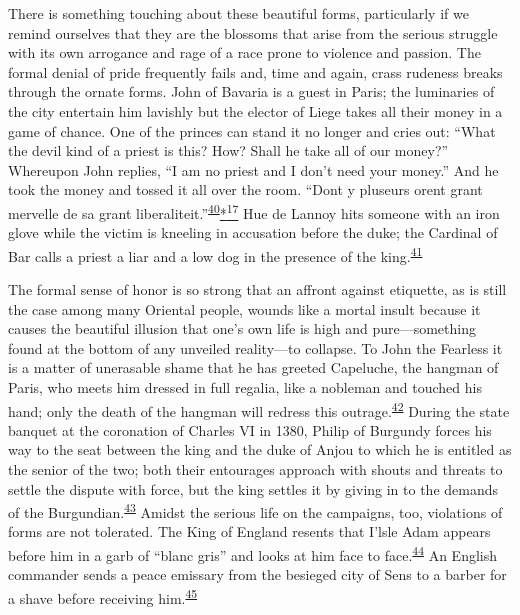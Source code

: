 There is something touching about these beautiful forms, particularly if
we remind ourselves that they are the blossoms that arise from the
serious struggle with its own arrogance and rage of a race prone to
violence and passion. The formal denial of pride frequently fails and,
time and again, crass rudeness breaks through the ornate forms. John of
Bavaria is a guest in Paris; the luminaries of the city entertain him
lavishly but the elector of Liege takes all their money in a game of
chance. One of the princes can stand it no longer and cries out: ``What
the devil kind of a priest is this? How? Shall he take all of our
money?'' Whereupon John replies, ``I am no priest and I don't need your
money.'' And he took the money and tossed it all over the room. ``Dont y
pluseurs orent grant mervelle de sa grant
liberaliteit.''\textsuperscript{\protect\hypertarget{09_Chapter_Two__THE_CRAVING_FOR_A_M.xhtmlux5cux23id_2008}{\protect\hyperlink{23_NOTES.xhtmlux5cux23page_403}{40}}}\protect\hypertarget{09_Chapter_Two__THE_CRAVING_FOR_A_M.xhtmlux5cux23id_2441}{\protect\hyperlink{23_NOTES.xhtmlux5cux23id_2442}{*\textsuperscript{17}}}
Hue de Lannoy hits someone with an iron glove while the victim is
kneeling in accusation before the duke; the Cardinal of Bar calls a
priest a liar and a low dog in the presence of the
king.\textsuperscript{\protect\hypertarget{09_Chapter_Two__THE_CRAVING_FOR_A_M.xhtmlux5cux23id_2006}{\protect\hyperlink{23_NOTES.xhtmlux5cux23id_2007}{41}}}

The formal sense of honor is so strong that an affront against
etiquette, as is still the case among many Oriental people, wounds like
a mortal insult because it causes the beautiful illusion that one's own
life is high and pure---something found at the bottom of any unveiled
reality---to collapse. To John the Fearless it is a matter of unerasable
shame that he has greeted Capeluche, the hangman of Paris, who meets him
dressed in full regalia, like a nobleman and touched his hand; only the
death of the hangman will redress this
outrage.\textsuperscript{\protect\hypertarget{09_Chapter_Two__THE_CRAVING_FOR_A_M.xhtmlux5cux23id_2004}{\protect\hyperlink{23_NOTES.xhtmlux5cux23id_2005}{42}}}
During the state banquet at the coronation of Charles VI in 1380, Philip
of Burgundy forces his way to the seat between the king and the duke of
Anjou to which he is entitled as the senior of the two; both their
entourages approach with shouts and threats to settle the dispute with
force, but the king settles it by giving in to the demands of the
Burgundian.\textsuperscript{\protect\hypertarget{09_Chapter_Two__THE_CRAVING_FOR_A_M.xhtmlux5cux23id_2002}{\protect\hyperlink{23_NOTES.xhtmlux5cux23id_2003}{43}}}
Amidst the serious life on the campaigns, too, violations of forms are
not tolerated. The King of England resents that I'lsle Adam appears
before him in a garb of ``blanc gris'' and looks at him face to
face.\textsuperscript{\protect\hypertarget{09_Chapter_Two__THE_CRAVING_FOR_A_M.xhtmlux5cux23id_2000}{\protect\hyperlink{23_NOTES.xhtmlux5cux23id_2001}{44}}}
An English commander sends a peace emissary from the besieged city of
Sens to a barber for a shave before receiving
him.\textsuperscript{\protect\hypertarget{09_Chapter_Two__THE_CRAVING_FOR_A_M.xhtmlux5cux23id_1998}{\protect\hyperlink{23_NOTES.xhtmlux5cux23id_1999}{45}}}

